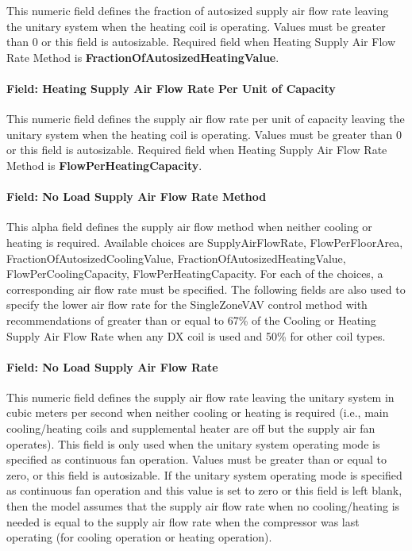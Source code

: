 This numeric field defines the fraction of autosized supply air flow rate leaving the unitary system when the heating coil is operating. Values must be greater than 0 or this field is autosizable. Required field when Heating Supply Air Flow Rate Method is \textbf{FractionOfAutosizedHeatingValue}.

\paragraph{Field: Heating Supply Air Flow Rate Per Unit of Capacity}\label{field-heating-supply-air-flow-rate-per-unit-of-capacity}

This numeric field defines the supply air flow rate per unit of capacity leaving the unitary system when the heating coil is operating. Values must be greater than 0 or this field is autosizable. Required field when Heating Supply Air Flow Rate Method is \textbf{FlowPerHeatingCapacity}.

\paragraph{Field: No Load Supply Air Flow Rate Method}\label{field-no-load-supply-air-flow-rate-method}

This alpha field defines the supply air flow method when neither cooling or heating is required. Available choices are SupplyAirFlowRate, FlowPerFloorArea, FractionOfAutosizedCoolingValue, FractionOfAutosizedHeatingValue, FlowPerCoolingCapacity, FlowPerHeatingCapacity. For each of the choices, a corresponding air flow rate must be specified. The following fields are also used to specify the lower air flow rate for the SingleZoneVAV control method with recommendations of greater than or equal to 67\% of the Cooling or Heating Supply Air Flow Rate when any DX coil is used and 50\% for other coil types.

\paragraph{Field: No Load Supply Air Flow Rate}\label{field-no-load-supply-air-flow-rate-000}

This numeric field defines the supply air flow rate leaving the unitary system in cubic meters per second when neither cooling or heating is required (i.e., main cooling/heating coils and supplemental heater are off but the supply air fan operates). This field is only used when the unitary system operating mode is specified as continuous fan operation. Values must be greater than or equal to zero, or this field is autosizable. If the unitary system operating mode is specified as continuous fan operation and this value is set to zero or this field is left blank, then the model assumes that the supply air flow rate when no cooling/heating is needed is equal to the supply air flow rate when the compressor was last operating (for cooling operation or heating operation).

